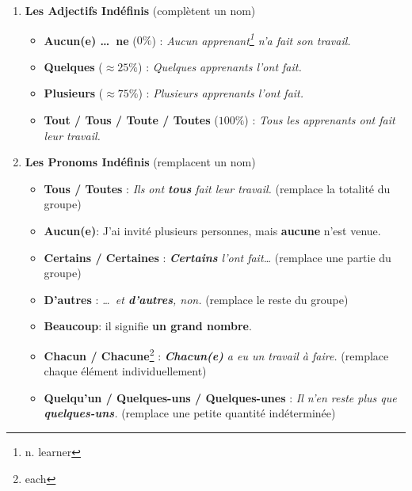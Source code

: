 \documentclass[math,code]{amznotes}
\theoremstyle{remark}
\begin{document}
\begin{enumerate}
    \item \textbf{Les Adjectifs Indéfinis} (complètent un nom)
    \begin{itemize}
        \item \textbf{Aucun(e) \dots\ ne} ($0\%$) : \textit{Aucun apprenant\footnote{n. learner} n'a fait son travail.}
        \item \textbf{Quelques} ($\approx 25\%$) : \textit{Quelques apprenants l'ont fait.}
        \item \textbf{Plusieurs} ($\approx 75\%$) : \textit{Plusieurs apprenants l'ont fait.}
        \item \textbf{Tout / Tous / Toute / Toutes} ($100\%$) : \textit{Tous les apprenants ont fait leur travail.}
    \end{itemize}

    \item \textbf{Les Pronoms Indéfinis} (remplacent un nom)
    \begin{itemize}
        \item \textbf{Tous / Toutes} : \textit{Ils ont \textbf{tous} fait leur travail.} (remplace la totalité du groupe)
        \item \textbf{Aucun(e)}: J'ai invité plusieurs personnes, mais \textbf{aucune} n'est venue.
        \item \textbf{Certains / Certaines} : \textit{\textbf{Certains} l'ont fait\dots} (remplace une partie du groupe)
        \item \textbf{D'autres} : \textit{\dots\ et \textbf{d'autres}, non.} (remplace le reste du groupe)
        \item \textbf{Beaucoup}: il signifie \textbf{un grand nombre}.
        \item \textbf{Chacun / Chacune}\footnote{each} : \textit{\textbf{Chacun(e)} a eu un travail à faire.} (remplace chaque élément individuellement)
        \item \textbf{Quelqu'un / Quelques-uns / Quelques-unes} : \textit{Il n'en reste plus que \textbf{quelques-uns}.} (remplace une petite quantité indéterminée)
    \end{itemize}


\end{enumerate}
\end{document}
